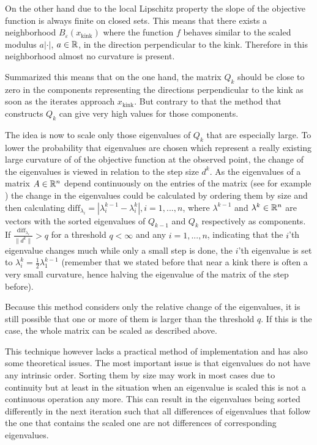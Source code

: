 On the other hand due to the local Lipschitz property the slope of the objective function is always finite on closed sets. This means that there exists a neighborhood \(B_{\varepsilon}(x_{\text{kink}})\) where the function \(f\) behaves similar to the scaled modulus \(a|\cdot|\), \(a \in \mathbb{R}\), in the direction perpendicular to the kink. Therefore in this neighborhood almost no curvature is present.

Summarized this means that on the one hand, the matrix \(Q_k\) should be close to zero in the components representing the directions perpendicular to the kink as soon as the iterates approach \(x_{\text{kink}}\). But contrary to that the method that constructs \(Q_k\) can give very high values for those components.

The idea is now to scale only those eigenvalues of \(Q_k\) that are especially large. To lower the probability that eigenvalues are chosen which represent a really existing large curvature of of the objective function at the observed point, the change of the eigenvalues is viewed in relation to the step size \(d^k\).
As the eigenvalues of a matrix \(A \in \mathbb{R}^n\) depend continuously on the entries of the matrix (see for example \cite[Theorem 1.2]{Werner1992}) the change in the eigenvalues could be calculated by ordering them by size and then calculating \(\text{diff}_{\lambda_i}=|\lambda_i^{k-1}-\lambda_i^{k}|, i = 1,...,n\), where \(\lambda^{k-1}\) and \(\lambda^{k} \in \mathbb{R}^n\) are vectors with the sorted eigenvalues of \(Q_{k-1}\) and \(Q_{k}\) respectively as components.
If \(\frac{\text{diff}_{\lambda_i}}{\|d^k\|} > q\) for a threshold \(q < \infty\) and any \(i = 1,...,n\), indicating that the \(i\)'th eigenvalue changes much while only a small step is done, the \(i\)'th eigenvalue is set to \(\lambda_i^{k}=\frac{1}{2}\lambda_1^{k-1}\) (remember that we stated before that near a kink there is often a very small curvature, hence halving the eigenvalue of the  matrix of the step before).

Because this method considers only the relative change of the eigenvalues, it is still possible that one or more of them is larger than the threshold \(q\). If this is the case, the whole matrix can be scaled as described above.

This technique however lacks a practical method of implementation and has also some theoretical issues.
The most important issue is that eigenvalues do not have any intrinsic order. Sorting them by size may work in most cases due to continuity but at least in the situation when an eigenvalue is scaled this is not a continuous operation any more. This can result in the eigenvalues being sorted differently in the next iteration such that all differences of eigenvalues that follow the one that contains the scaled one are not differences of corresponding eigenvalues.

